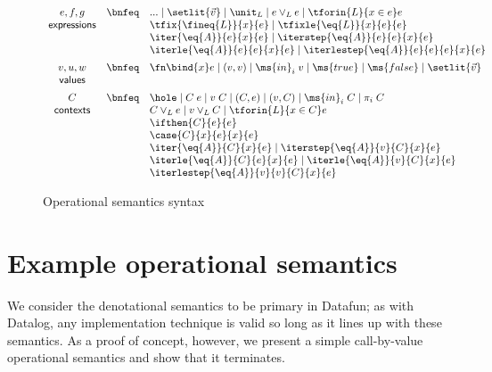 \begin{figure}
  \[\begin{array}{ccl}
    e,f,g
    &\bnfeq& ... \pipe \setlit{\vec{v}} \pipe \unit_L \pipe e \vee_L e \pipe \tforin{L}{x \in e} e\\
    \textsf{expressions}
    && \tfix{\fineq{L}}{x}{e} \pipe \tfixle{\eq{L}}{x}{e}{e}\\
    && \iter{\eq{A}}{e}{x}{e} \pipe \iterstep{\eq{A}}{e}{e}{x}{e}\\
    && \iterle{\eq{A}}{e}{e}{x}{e} \pipe \iterlestep{\eq{A}}{e}{e}{e}{x}{e}
    \vspace{0.5em}\\
    v,u,w
    &\bnfeq& \fn\bind{x} e \pipe (v, v) \pipe \ms{in}_i\; v
    \pipe \ms{true} \pipe \ms{false} \pipe \setlit{\vec{v}}\\
    \textsf{values}
    \vspace{0.5em}\\
    C
    &\bnfeq& \hole \pipe C\;e \pipe v\;C \pipe (C, e) \pipe (v, C) \pipe \ms{in}_i\;C
    \pipe \pi_i \; C\\
    \textsf{contexts}
    && C \vee_L e \pipe v \vee_L C \pipe \tforin{L}{x \in C} e\\
    && \ifthen{C}{e}{e}\\
    && \case{C}{x}{e}{x}{e}\\
    && \iter{\eq{A}}{C}{x}{e} \pipe \iterstep{\eq{A}}{v}{C}{x}{e}\\
    && \iterle{\eq{A}}{C}{e}{x}{e} \pipe \iterle{\eq{A}}{v}{C}{x}{e}\\
    && \iterlestep{\eq{A}}{v}{v}{C}{x}{e}
  \end{array}\]
  \caption{Operational semantics syntax}
  \label{fig:opsem-syntax}
\end{figure}


\section{Example operational semantics}

We consider the denotational semantics to be primary in Datafun; as with
Datalog, any implementation technique is valid so long as it lines up with these
semantics. As a proof of concept, however, we present a simple call-by-value operational semantics and show that it terminates.

